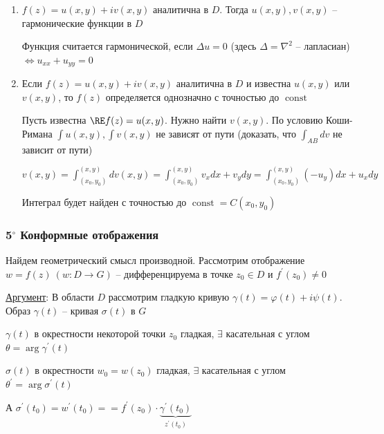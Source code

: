 \documentclass[12pt]{article}
\begin{document}
\begin{enumerate}[label=\arabic*$^\circ$]
    \item $f(z) = u(x, y) + i v(x, y)$ аналитична в $D$. Тогда $u(x, y), v(x, y)$ -- гармонические функции в $D$

    \begin{MyProof}
        Функция считается гармонической, если $\Delta u = 0$ (здесь $\Delta = \nabla^2$ -- лапласиан) $\Longleftrightarrow u_{xx} + u_{yy} = 0$
        
        \Lab
    \end{MyProof}

    \item Если $f(z) = u(x, y) + i v(x, y)$ аналитична в $D$ и известна $u(x, y)$ или $v(x, y)$, то $f(z)$ определяется однозначно с точностью до $\operatorname{const}$

    \begin{MyProof}
        Пусть известна $\RE f(z) = u(x, y)$. Нужно найти $v(x, y)$. По условию Коши-Римана $\int u(x, y), \int v(x, y)$ не зависят от пути
        (\Lab доказать, что $\int_{AB} dv$ не зависит от пути)

        $v(x, y) = \int_{(x_0, y_0)}^{(x, y)} dv(x, y) = \int_{(x_0, y_0)}^{(x, y)} v_x dx + v_y dy = \int_{(x_0, y_0)}^{(x, y)} (-u_y) dx + u_x dy$

        Интеграл будет найден с точностью до $\operatorname{const} = C(x_0, y_0)$
    \end{MyProof}

\end{enumerate}


\subsubsection{5$^\circ$ Конформные отображения}

Найдем геометрический смысл производной. Рассмотрим отображение $w = f(z) \ (w : D \longrightarrow G)$ -- дифференцируема в точке $z_0 \in D$ и $f^\prime(z_0) \neq 0$

\underline{Аргумент}: В области $D$ рассмотрим гладкую кривую $\gamma(t) = \varphi(t) + i\psi(t)$. Образ $\gamma(t)$ -- кривая $\sigma(t)$ в $G$

$\gamma(t)$ в окрестности некоторой точки $z_0$ гладкая, $\exists$ касательная с углом $\theta = \arg \gamma^\prime(t)$

$\sigma(t)$ в окрестности $w_0 = w(z_0)$ гладкая, $\exists$ касательная с углом $\theta^\prime = \arg \sigma^\prime(t)$

А $\sigma^\prime(t_0) = w^\prime (t_0) = =f^\prime(z_0) \cdot \underset{z^\prime(t_0)}{\underbrace{\gamma^\prime(t_0)}}$
\end{document}
